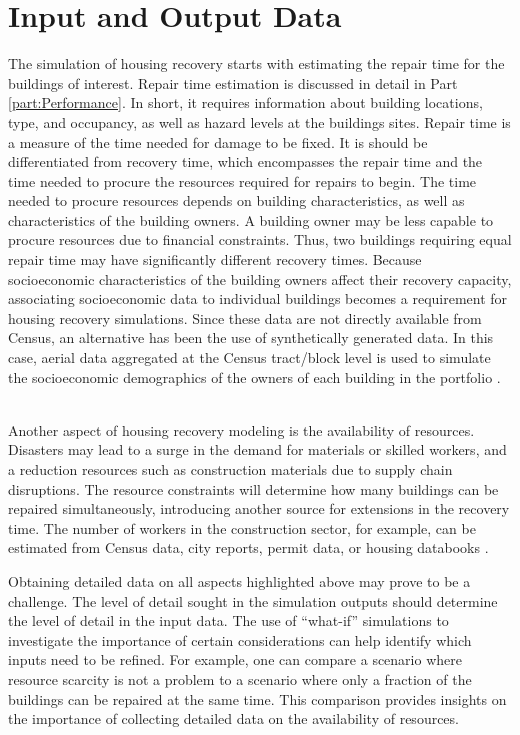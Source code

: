 \section{Input and Output Data} 
The simulation of housing recovery starts with estimating the repair time for the buildings of interest. Repair time estimation is discussed in detail in Part \ref{part:Performance}. In short, it requires information about building locations, type, and occupancy, as well as hazard levels at the buildings sites. Repair time is a measure of the time needed for damage to be fixed. It is should be differentiated from recovery time, which encompasses the repair time and the time needed to procure the resources required for repairs to begin. The time needed to procure resources depends on building characteristics, as well as characteristics of the building owners. A building owner may be less capable to procure resources due to financial constraints. Thus, two buildings requiring equal repair time may have significantly different recovery times. Because socioeconomic characteristics of the building owners affect their recovery capacity, associating socioeconomic data to individual buildings becomes a requirement for housing recovery simulations. Since these data are not directly available from Census, an alternative has been the use of synthetically generated data. In this case, aerial data aggregated at the Census tract/block level is used to simulate the socioeconomic demographics of the owners of each building in the portfolio \citep{rosenheim2019integration}. \ 

Another aspect of housing recovery modeling is the availability of resources. Disasters may lead to a surge in the demand for materials or skilled workers, and a reduction resources such as construction materials due to supply chain disruptions. The resource constraints will determine how many buildings can be repaired simultaneously, introducing another source for extensions in the recovery time. The number of workers in the construction sector, for example, can be estimated from Census data, city reports, permit data, or housing databooks \citep{kang2018replicating, costa2020housing}. \

Obtaining detailed data on all aspects highlighted above may prove to be a challenge. The level of detail sought in the simulation outputs should determine the level of detail in the input data. The use of ``what-if'' simulations to investigate the importance of certain considerations can help identify which inputs need to be refined. For example, one can compare a scenario where resource scarcity is not a problem to a scenario where only a fraction of the buildings can be repaired at the same time. This comparison provides insights on the importance of collecting detailed data on the availability of resources.\ 


